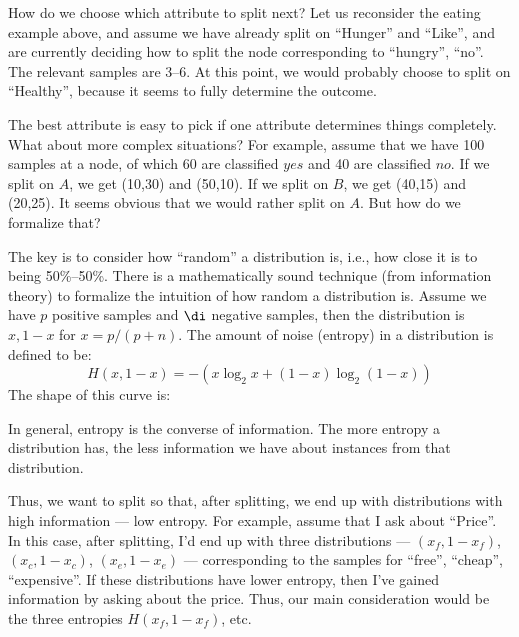How do we choose which attribute to split next?  Let us reconsider the
eating example above, and assume we have already split on ``Hunger'' and
``Like'', and are currently deciding how to split the node corresponding to
``hungry'', ``no''.  The relevant samples are 3--6.  At this point, we would
probably choose to split on ``Healthy'', because it seems to fully determine
the outcome.

The best attribute is easy to pick if one attribute determines things
completely.  What about more complex situations?  For example, assume
that we have 100 samples at a node, of which 60 are classified $yes$ and 40 are
classified $no$.  If we split on $A$, we get (10,30) and (50,10).  If we
split on $B$, we get (40,15) and (20,25).  It seems obvious that we would
rather split on $A$.  But how do we formalize that?

The key is to consider how ``random'' a distribution is, i.e., how
close it is to being 50\%--50\%.  There is a mathematically sound
technique (from information theory) to formalize the intuition of how
random a distribution is.  Assume we have $p$ positive samples and $\di$
negative samples, then the distribution is $x,1-x$ for $x=p/(p+n)$.
The amount of noise (entropy) in a distribution is defined to be: 
\[
  H(x,1-x) = - (x {\log}_2 x + (1-x) {\log}_2 (1-x))
\]
The shape of this curve is:

\centerline{}


In general, entropy is the converse of information.  The more entropy a
distribution has, the less information we have about instances from that
distribution.  

Thus, we want to split so that, after splitting, we end up with
distributions with high information --- low entropy.  For example, assume
that I ask about ``Price''.  In this case, after splitting, I'd end up with
three distributions --- $(x_f,1-x_f)$, $(x_c,1-x_c)$, $(x_e,1-x_e)$ ---
corresponding to the samples for ``free'', ``cheap'', ``expensive''.
If these distributions have lower entropy, then I've gained
information by asking about the price.  Thus, our main consideration
would be the three entropies $H(x_f, 1-x_f)$, etc.

